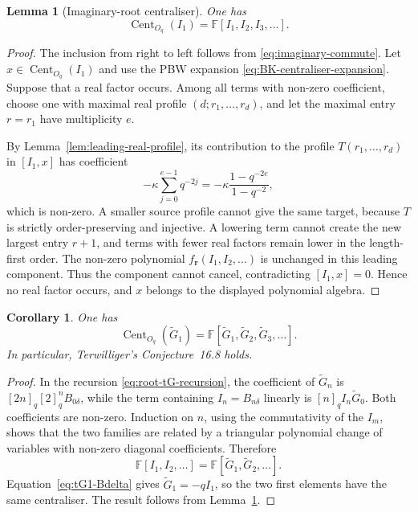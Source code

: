 \documentclass[11pt]{extarticle}
\newtheorem{lemma}[theorem]{Lemma}
\newtheorem{corollary}[theorem]{Corollary}
\theoremstyle{definition}
\theoremstyle{remark}
\numberwithin{equation}{section}
\newcommand{\F}{\mathbb F}
\newcommand{\Oq}{O_q}
\DeclareMathOperator{\Cent}{Cent}
\begin{document}
\begin{lemma}[Imaginary-root centraliser]
\label{lem:imaginary-centraliser}
One has
\begin{equation}
\label{eq:I1-centraliser}
        \Cent_{\Oq}(I_1)=\F[I_1,I_2,I_3,\ldots].
\end{equation}
\end{lemma}

\begin{proof}
The inclusion from right to left follows from
\eqref{eq:imaginary-commute}.  Let $x\in\Cent_{\Oq}(I_1)$ and use the PBW
expansion \eqref{eq:BK-centraliser-expansion}.  Suppose that a real factor
occurs.  Among all terms with non-zero coefficient, choose one with maximal
real profile $(d;r_1,\ldots,r_d)$, and let the maximal entry $r=r_1$ have
multiplicity $e$.

By Lemma~\ref{lem:leading-real-profile}, its contribution to the profile
$T(r_1,\ldots,r_d)$ in $[I_1,x]$ has coefficient
\[
 -\kappa\sum_{j=0}^{e-1}q^{-2j}
 =-\kappa\frac{1-q^{-2e}}{1-q^{-2}},
\]
which is non-zero.  A smaller source profile cannot give the same target,
because $T$ is strictly order-preserving and injective.  A lowering term
cannot create the new largest entry $r+1$, and terms with fewer real factors
remain lower in the length-first order.  The non-zero polynomial
$f_{\boldsymbol r}(I_1,I_2,\ldots)$ is unchanged in this leading component.
Thus the component cannot cancel, contradicting $[I_1,x]=0$.  Hence no real
factor occurs, and $x$ belongs to the displayed polynomial algebra.
\end{proof}

\begin{corollary}
\label{cor:conj168}
One has
\begin{equation}
\label{eq:tG1-centraliser}
 \Cent_{\Oq}(\widetilde G_1)
 =\F[\widetilde G_1,\widetilde G_2,\widetilde G_3,\ldots].
\end{equation}
In particular, Terwilliger's Conjecture~16.8 holds.
\end{corollary}

\begin{proof}
In the recursion \eqref{eq:root-tG-recursion}, the coefficient of
$\widetilde G_n$ is $[2n]_q[2]_q^nB_{0\delta}$, while the term containing
$I_n=B_{n\delta}$ linearly is $[n]_qI_n\widetilde G_0$.  Both coefficients
are non-zero.  Induction on $n$, using the commutativity of the $I_m$, shows
that the two families are related by a triangular polynomial change of
variables with non-zero diagonal coefficients.  Therefore
\[
 \F[I_1,I_2,\ldots]
 =\F[\widetilde G_1,\widetilde G_2,\ldots].
\]
Equation~\eqref{eq:tG1-Bdelta} gives $\widetilde G_1=-qI_1$, so the two
first elements have the same centraliser.  The result follows from
Lemma~\ref{lem:imaginary-centraliser}.
\end{proof}
\end{document}
